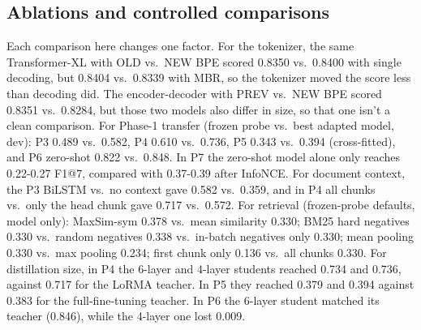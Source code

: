 \documentclass[11pt, oneside]{article}
\begin{document}
\subsection{Ablations and controlled comparisons}
\label{sec:abl}
Each comparison here changes one factor.
For the tokenizer, the same Transformer-XL with OLD vs.\ NEW BPE scored 0.8350
vs.\ 0.8400 with single decoding, but 0.8404 vs.\ 0.8339 with MBR, so the
tokenizer moved the score less than decoding did. The encoder-decoder with
PREV vs.\ NEW BPE scored 0.8351 vs.\ 0.8284, but those two models also differ
in size, so that one isn't a clean comparison.
For Phase-1 transfer (frozen probe vs.\ best adapted model, dev): P3 0.489
vs.\ 0.582, P4 0.610 vs.\ 0.736, P5 0.343 vs.\ 0.394 (cross-fitted), and P6
zero-shot 0.822 vs.\ 0.848. In P7 the zero-shot model alone only reaches
0.22-0.27 F1@7, compared with 0.37-0.39 after InfoNCE.
For document context, the P3 BiLSTM vs.\ no context gave 0.582 vs.\ 0.359,
and in P4 all chunks vs.\ only the head chunk gave 0.717 vs.\ 0.572.
For retrieval (frozen-probe defaults, model only): MaxSim-sym 0.378 vs.\ mean
similarity 0.330; BM25 hard negatives 0.330 vs.\ random negatives 0.338 vs.\
in-batch negatives only 0.330; mean pooling 0.330 vs.\ max pooling 0.234;
first chunk only 0.136 vs.\ all chunks 0.330.
For distillation size, in P4 the 6-layer and 4-layer students reached 0.734
and 0.736, against 0.717 for the LoRMA teacher. In P5 they reached 0.379 and
0.394 against 0.383 for the full-fine-tuning teacher. In P6 the 6-layer
student matched its teacher (0.846), while the 4-layer one lost 0.009.
\end{document}
